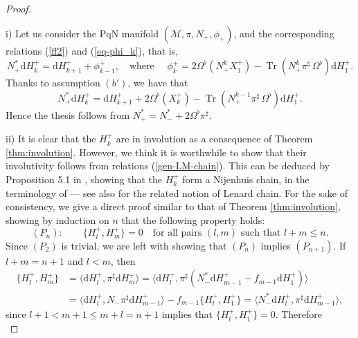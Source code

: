 \documentclass[12pt]{article}
\def\d{{\mathrm d}}
\def\parpo#1#2{\{#1,#2\}}
\def\M{{\mathcal M}}
\def\Tr{\operatorname{Tr}}
\begin{document}
\begin{proof}%
{\ }\par\noindent
i) Let us consider the PqN manifold $(\M,\pi,N_+,\phi_+)$, and the corresponding relations (\ref{ff2}) and (\ref{eq-phi_k}), that is,
\begin{equation}
\label{ff2+eq-phi_k+}
N_+^* \d H^+_{k}=\d H^+_{k+1}+{\phi^+_{k-1}},\quad\text{where } \quad \phi^+_k=2\Omega^\flat({N}_+^k X_1^+)-\Tr\left({N}_+^k\pi^\sharp\,\Omega^\flat\right)\d H^+_1.
\end{equation}
Thanks to assumption $(b')$, we have that 
\begin{equation}
N_+^* \d H^+_{k}=\d H^+_{k+1}+2\Omega^\flat (X_k^+) -\Tr\left({N}_+^{k-1}\pi^\sharp\,\Omega^\flat\right)\d H^+_1.
\end{equation}
Hence the thesis follows from $N^*_+=N^*_- +2\Omega^\flat\pi^\sharp$.
\par\noindent
ii) It is clear that the ${H^+_k}$ are in involution as a consequence of Theorem \ref{thm:involution}. However, we think it is worthwhile to show that their involutivity follows from relations (\ref{gen-LM-chain}). This can be deduced by Proposition 5.1 in \cite{Tondo1995}, showing that the ${H^+_k}$ form a Nijenhuis chain, in the terminology of \cite{FMT2000} --- see also \cite{Magri2003} for the related notion of Lenard chain.
For the sake of consistency, %
we give a direct proof similar to that of Theorem \ref{thm:involution}, 
showing by induction on $n$ that the following property holds:
\begin{equation*}
(P_n):\qquad\parpo{H^+_l}{H^+_m}=0\quad\mbox{for all pairs $(l,m)$ such that $l+m\le n$.}
\end{equation*}
Since $(P_2)$ is trivial, we are left with showing that $(P_n)$ implies $(P_{n+1})$. If $l+m=n+1$ and $l<m$, then 
\begin{equation*}
\begin{aligned}
 \parpo{H^+_l}{H^+_m}
 &=\langle \d H^+_l,\pi^\sharp \d H^+_m\rangle
 =\langle \d H^+_l,\pi^\sharp \left(N^*_-\d H^+_{m-1}-f_{m-1}\d H^+_1\right)\rangle\\
 &=\langle \d H^+_l,N_-\pi^\sharp \d H^+_{m-1}\rangle-f_{m-1}\parpo{H^+_l}{H^+_1}
 =\langle N^*_-\d H^+_l,\pi^\sharp \d H^+_{m-1}\rangle,
\end{aligned}
\end{equation*}
since $l+1<m+1\le m+l=n+1$ implies that $\parpo{H^+_l}{H^+_1}=0$. Therefore
\begin{equation*}

\end{equation*}
\end{proof}
\end{document}
